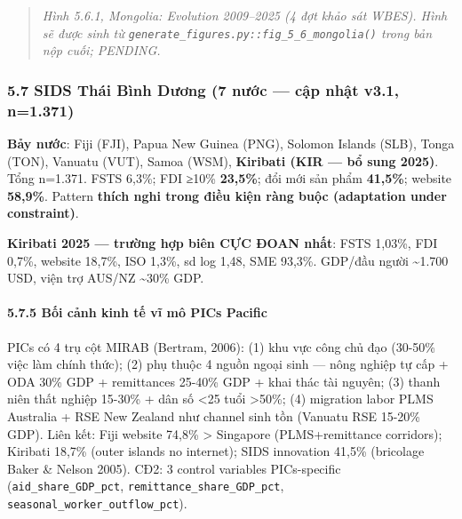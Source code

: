 \documentclass[12pt,a4paper]{article}
\begin{document}
\begin{quote}
\emph{Hình 5.6.1, Mongolia: Evolution 2009--2025 (4 đợt khảo sát WBES).
Hình sẽ được sinh từ
\texttt{generate\_figures.py::fig\_5\_6\_mongolia()} trong bản nộp cuối;
PENDING.}
\end{quote}

\hypertarget{57-sids-thuxe1i-buxecnh-dux1b0ux1a1ng-7-nux1b0ux1edbc--cux1eadp-nhux1eadt-v31-n1371}{%
\subsubsection{5.7 SIDS Thái Bình Dương (7 nước --- cập nhật v3.1,
n=1.371)}\label{57-sids-thuxe1i-buxecnh-dux1b0ux1a1ng-7-nux1b0ux1edbc--cux1eadp-nhux1eadt-v31-n1371}}

\textbf{Bảy nước}: Fiji (FJI), Papua New Guinea (PNG), Solomon Islands
(SLB), Tonga (TON), Vanuatu (VUT), Samoa (WSM), \textbf{Kiribati (KIR
--- bổ sung 2025)}. Tổng n=1.371. FSTS 6,3\%; FDI ≥10\% \textbf{23,5\%};
đổi mới sản phẩm \textbf{41,5\%}; website \textbf{58,9\%}. Pattern
\textbf{thích nghi trong điều kiện ràng buộc (adaptation under
constraint)}.

\textbf{Kiribati 2025 --- trường hợp biên CỰC ĐOAN nhất}: FSTS 1,03\%,
FDI 0,7\%, website 18,7\%, ISO 1,3\%, sd log 1,48, SME 93,3\%. GDP/đầu
người \textasciitilde1.700 USD, viện trợ AUS/NZ \textasciitilde30\% GDP.

\hypertarget{575-bux1ed1i-cux1ea3nh-kinh-tux1ebf-vux129-muxf4-pics-pacific}{%
\paragraph{5.7.5 Bối cảnh kinh tế vĩ mô PICs
Pacific}\label{575-bux1ed1i-cux1ea3nh-kinh-tux1ebf-vux129-muxf4-pics-pacific}}

PICs có 4 trụ cột MIRAB (Bertram, 2006): (1) khu vực công chủ đạo
(30-50\% việc làm chính thức); (2) phụ thuộc 4 nguồn ngoại sinh --- nông
nghiệp tự cấp + ODA 30\% GDP + remittances 25-40\% GDP + khai thác tài
nguyên; (3) thanh niên thất nghiệp 15-30\% + dân số \textless25 tuổi
\textgreater50\%; (4) migration labor PLMS Australia + RSE New Zealand
như channel sinh tồn (Vanuatu RSE 15-20\% GDP). Liên kết: Fiji website
74,8\% \textgreater{} Singapore (PLMS+remittance corridors); Kiribati
18,7\% (outer islands no internet); SIDS innovation 41,5\% (bricolage
Baker \& Nelson 2005). CĐ2: 3 control variables PICs-specific
(\texttt{aid\_share\_GDP\_pct}, \texttt{remittance\_share\_GDP\_pct},
\texttt{seasonal\_worker\_outflow\_pct}).
\end{document}

